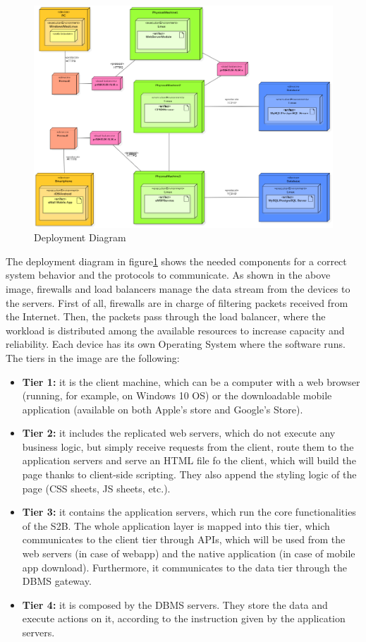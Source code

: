 \begin{figure}[H]
    \begin{center}
        \includegraphics[width=\textwidth]{img/DeploymentDiagram.PNG}
        \caption{Deployment Diagram}\label{deployment_diagram}
    \end{center}
\end{figure}

The deployment diagram in figure\ref{deployment_diagram} shows the needed components for a correct system behavior and the protocols to communicate. As shown in the above image, firewalls and load balancers manage the data stream
from the devices to the servers. First of all, firewalls are in charge of filtering packets
received from the Internet. Then, the packets pass through the load balancer, where
the workload is distributed among the available resources to increase capacity and
reliability.
Each device has its own Operating System where the software runs.
The tiers in the image are the following:
\begin{itemize}
    \item \textbf{Tier 1:} it is the client machine, which can be a computer with a web browser (running, for example, on Windows 10 OS) or the downloadable mobile application (available on both Apple's store and Google's Store).
    \item \textbf{Tier 2:} it includes the replicated web servers, which do not execute any business logic, but simply receive requests from the client, route them to the application servers and serve an HTML file fo the client, which will build the page thanks to client-side scripting. They also append the styling logic of the page (CSS sheets, JS sheets, etc.).
    \item \textbf{Tier 3:} it contains the application servers, which run the core functionalities of the S2B. The whole application layer is mapped into this tier, which communicates to the client tier through APIs, which will be used from the web servers (in case of webapp) and the native application (in case of mobile app download). Furthermore, it communicates to the data tier through the DBMS gateway.
    \item \textbf{Tier 4:} it is composed by the DBMS servers. They store the data and execute actions on it, according to the instruction given by the application servers.
\end{itemize}
